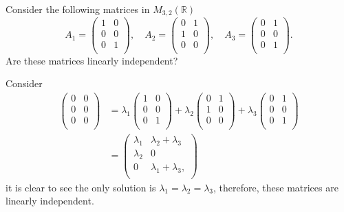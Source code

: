 \begin{example}
    Consider the following matrices in $M_{3,2}(\mathbb{R})$ 
    \[
        A_1 =
        \begin{pmatrix}
            1 & 0 \\
            0 & 0 \\
            0 & 1 \\
        \end{pmatrix}
        , \quad A_2 =
        \begin{pmatrix}
            0 & 1 \\
            1 & 0 \\
            0 & 0 \\
        \end{pmatrix}
        , \quad A_3 =
        \begin{pmatrix}
            0 & 1 \\
            0 & 0 \\
            0 & 1 \\
        \end{pmatrix}
        .
    \]
    Are these matrices linearly independent?
    
    Consider 
    \begin{align*}
        \begin{pmatrix}
            0 & 0 \\
            0 & 0 \\
            0 & 0 \\
        \end{pmatrix}
        &= \lambda_1
        \begin{pmatrix}
            1 & 0 \\
            0 & 0 \\
            0 & 1 \\
        \end{pmatrix}
        + \lambda_2
        \begin{pmatrix}
            0 & 1 \\
            1 & 0 \\
            0 & 0 \\
        \end{pmatrix}
        + \lambda_3
        \begin{pmatrix}
            0 & 1 \\
            0 & 0 \\
            0 & 1 \\
        \end{pmatrix}
        \\
        &=
        \begin{pmatrix}
            \lambda_1 & \lambda_2 + \lambda_3 \\
            \lambda_2 & 0 \\
            0 & \lambda_1 + \lambda_3, \\
        \end{pmatrix}
    \end{align*}
    it is clear to see the only solution is $\lambda_1 = \lambda_2 = \lambda_3$, therefore, these matrices are linearly independent.
\end{example}

